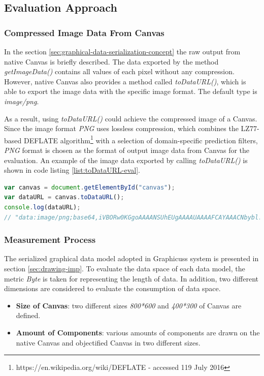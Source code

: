 
\subsection{Evaluation Approach}

\subsubsection{Compressed Image Data From Canvas}
In the section \ref{sec:graphical-data-serialization-concept} the raw output from native Canvas is briefly described. The data exported by the method \textit{getImageData()} contains all values of each pixel without any compression. However, native Canvas also provides a method called \textit{toDataURL()}, which is able to export the image data with the specific image format. The default type is \textit{image/png}.

As a result, using \textit{toDataURL()} could achieve the compressed image  of a Canvas. Since the image format \textit{PNG} uses lossless compression, which combines the LZ77-based DEFLATE algorithm\footnote{https://en.wikipedia.org/wiki/DEFLATE - accessed 119 July 2016} with a selection of domain-specific prediction filters, \textit{PNG} format is chosen as the format of output image data  from Canvas for the evaluation\cite{barron1998minimum}. An example of the image data exported by calling \textit{toDataURL()} is shown in code listing \ref{list:toDataURL-eval}.


\begin{lstlisting}[language=JavaScript, caption=Example of image data while calling toDataURL() , label={list:toDataURL-eval}]
var canvas = document.getElementById("canvas");
var dataURL = canvas.toDataURL();
console.log(dataURL);
// "data:image/png;base64,iVBORw0KGgoAAAANSUhEUgAAAAUAAAAFCAYAAACNbybl...ADElEQVQImWNgoBMAAABpAAFEI8ARAAAAAElFTkSuQmCC"
\end{lstlisting}

\subsubsection{Measurement Process}
The serialized graphical data model adopted in Graphicuss system is presented in section \ref{sec:drawing-imp}. To evaluate the data space of each data model, the metric \textit{Byte} is taken for representing the length of data. In addition, two different dimensions are considered to evaluate the consumption of data space.

\begin{itemize}
  \item \textbf{Size of Canvas}: two different sizes \textit{800*600} and \textit{400*300} of Canvas are defined.
  \item \textbf{Amount of Components}: various amounts of components are drawn on the native Canvas and objectified Canvas in two different sizes.
\end{itemize}

